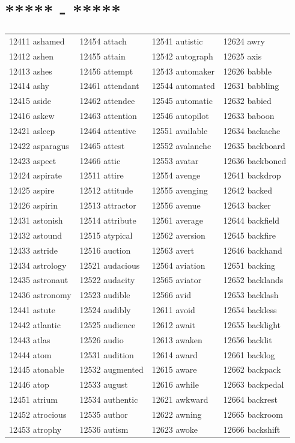 \documentclass[10pt, oneside]{book}
\begin{document}
\begin{table}
	\centering
	\section*{***** - *****}
	\begin{tabular}{l l l l}
12411 ashamed &12454 attach &12541 autistic &12624 awry\\
12412 ashen &12455 attain &12542 autograph &12625 axis\\
12413 ashes &12456 attempt &12543 automaker &12626 babble\\
12414 ashy &12461 attendant &12544 automated &12631 babbling\\
12415 aside &12462 attendee &12545 automatic &12632 babied\\
12416 askew &12463 attention &12546 autopilot &12633 baboon\\
12421 asleep &12464 attentive &12551 available &12634 backache\\
12422 asparagus &12465 attest &12552 avalanche &12635 backboard\\
12423 aspect &12466 attic &12553 avatar &12636 backboned\\
12424 aspirate &12511 attire &12554 avenge &12641 backdrop\\
12425 aspire &12512 attitude &12555 avenging &12642 backed\\
12426 aspirin &12513 attractor &12556 avenue &12643 backer\\
12431 astonish &12514 attribute &12561 average &12644 backfield\\
12432 astound &12515 atypical &12562 aversion &12645 backfire\\
12433 astride &12516 auction &12563 avert &12646 backhand\\
12434 astrology &12521 audacious &12564 aviation &12651 backing\\
12435 astronaut &12522 audacity &12565 aviator &12652 backlands\\
12436 astronomy &12523 audible &12566 avid &12653 backlash\\
12441 astute &12524 audibly &12611 avoid &12654 backless\\
12442 atlantic &12525 audience &12612 await &12655 backlight\\
12443 atlas &12526 audio &12613 awaken &12656 backlit\\
12444 atom &12531 audition &12614 award &12661 backlog\\
12445 atonable &12532 augmented &12615 aware &12662 backpack\\
12446 atop &12533 august &12616 awhile &12663 backpedal\\
12451 atrium &12534 authentic &12621 awkward &12664 backrest\\
12452 atrocious &12535 author &12622 awning &12665 backroom\\
12453 atrophy &12536 autism &12623 awoke &12666 backshift\\
	\end{tabular}
 \end{table}
\end{document}
